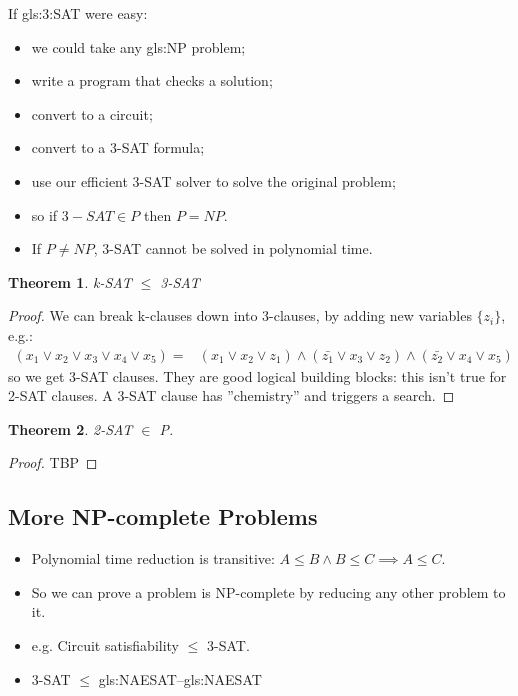 \documentclass[]{article}
\newtheorem{thm}{Theorem}
\begin{document}
If \gls{gls:3:SAT} were easy:
\begin{itemize}
	\item we could take any \gls{gls:NP} problem;
	\item write a program that checks a solution;
	\item convert to a circuit;
	\item convert to a 3-SAT formula;
	\item use our efficient 3-SAT solver to solve the original problem;
	\item so if $3-SAT \in P$ then $P=NP$.
	\item If $P\ne NP$, 3-SAT cannot be solved in polynomial time.
\end{itemize}

\begin{thm}
	k-SAT $\le$ 3-SAT
\end{thm}

\begin{proof}
	We can break k-clauses down into 3-clauses, by adding new variables $\{z_i\}$, e.g.:
	\begin{align*}
		(x_1 \lor x_2 \lor x_3 \lor x_4 \lor x_5) =& (x_1 \lor x_2 \lor z_1) \land (\bar{z_1} \lor x_3 \lor z_2) \land (\bar{z_2} \lor x_4 \lor x_5)
	\end{align*}
	so we get 3-SAT clauses. They are good logical building blocks: this isn't true for 2-SAT clauses. A 3-SAT clause has ''chemistry'' and triggers a search. 
\end{proof}

\begin{thm}
	2-SAT $\in$ P.
\end{thm}

\begin{proof}
	TBP
\end{proof}

\subsection{More NP-complete Problems}

\begin{itemize}
	\item Polynomial time reduction is transitive: $A \le B \land B \le C\implies A \le C$.
	\item So we can prove a problem is NP-complete by reducing any other problem to it.
	\item e.g. Circuit satisfiability $\le$ 3-SAT.
	\item 3-SAT $\le$ \gls{gls:NAESAT}--\glsdesc{gls:NAESAT}
\end{itemize}
\end{document}
